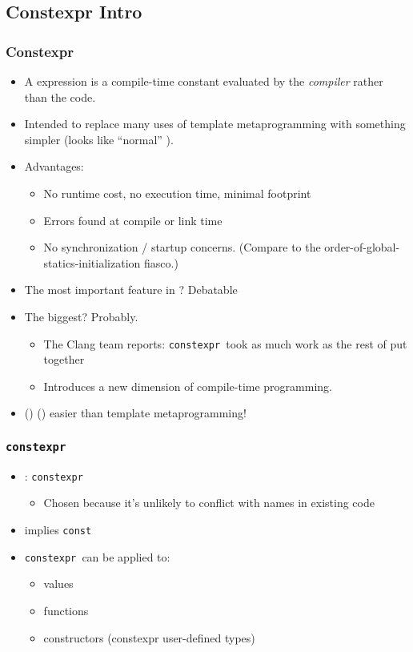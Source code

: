 \subsection{Constexpr Intro}

\newcommand{\cexpr}{\texttt{constexpr }}

\begin{frame}[fragile,t]
\frametitle{Constexpr }
\begin{itemize}[<+->]
\item A \Emph{\cexpr} expression is a compile-time constant evaluated
  by the \emph{compiler} rather than the code.
\item Intended to replace many uses of template metaprogramming with
  something simpler (looks like ``normal'' \CC).
\item Advantages:
  \begin{itemize}
    \item No runtime cost, no execution time, minimal footprint
    \item Errors found at compile or link time
    \item No synchronization / startup concerns. (Compare to the
      order-of-global-statics-initialization fiasco.)
  \end{itemize}
\item The most important feature in ?  Debatable
\item The biggest?  Probably.
  \begin{itemize}
  \item The Clang team reports: \cexpr took as much work as the rest
    of  put together
  \item Introduces a new dimension of compile-time programming.
  \end{itemize}

\item {} ()  () easier than template metaprogramming!
\end{itemize}
\end{frame}


\begin{frame}[fragile,t]
\frametitle{\cexpr}
\begin{itemize}[<+->]
\item {}: \cexpr
  \begin{itemize}
  \item Chosen because it's unlikely to conflict with names in existing code
  \end{itemize}
\item implies \texttt{const}
\item \cexpr can be applied to:
\begin{itemize}
  \item values 
  \item functions
  \item constructors (constexpr user-defined types)
\end{itemize}
\end{itemize}
\end{frame}




